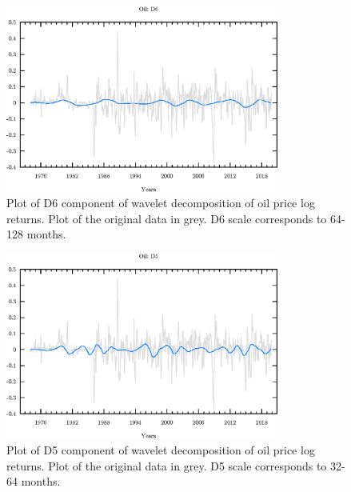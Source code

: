 \begin{figure}
\begin{center}
\includegraphics[width=0.8\textwidth]{./code/plot/oil_wr_D6.eps}
\caption{Plot of D6 component of wavelet decomposition of oil price log returns. 
	Plot of the original data in grey. D6 scale corresponds to 64-128 months.}
\label{fig:oil-wr-d6}
\end{center}
\end{figure}

\begin{figure}
\begin{center}
\includegraphics[width=0.8\textwidth]{./code/plot/oil_wr_D5.eps}
\caption{Plot of D5 component of wavelet decomposition of oil price log returns. 
	Plot of the original data in grey. D5 scale corresponds to 32-64 months.}
\label{fig:oil-wr-d5}
\end{center}
\end{figure}

